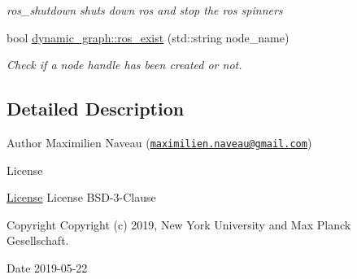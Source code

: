 \begin{DoxyCompactItemize}
\begin{DoxyCompactList}\small\item\em ros\+\_\+shutdown shuts down ros and stop the ros spinners \end{DoxyCompactList}\item 
bool \hyperlink{namespacedynamic__graph_ab000cd6e1e6ed365a5a3e1adddf89dff}{dynamic\+\_\+graph\+::ros\+\_\+exist} (std\+::string node\+\_\+name)\hypertarget{namespacedynamic__graph_ab000cd6e1e6ed365a5a3e1adddf89dff}{}\label{namespacedynamic__graph_ab000cd6e1e6ed365a5a3e1adddf89dff}

\begin{DoxyCompactList}\small\item\em Check if a node handle has been created or not. \end{DoxyCompactList}\end{DoxyCompactItemize}


\subsection{Detailed Description}
\begin{DoxyAuthor}{Author}
Maximilien Naveau (\href{mailto:maximilien.naveau@gmail.com}{\tt maximilien.\+naveau@gmail.\+com}) 
\end{DoxyAuthor}
\begin{DoxyRefDesc}{License}
\item[\hyperlink{license__license000015}{License}]License B\+S\+D-\/3-\/\+Clause \end{DoxyRefDesc}
\begin{DoxyCopyright}{Copyright}
Copyright (c) 2019, New York University and Max Planck Gesellschaft. 
\end{DoxyCopyright}
\begin{DoxyDate}{Date}
2019-\/05-\/22 
\end{DoxyDate}
